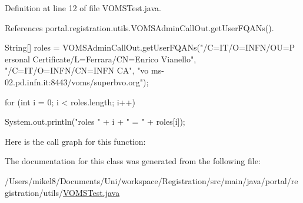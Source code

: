 Definition at line 12 of file VOMSTest.java.



References portal.registration.utils.VOMSAdminCallOut.getUserFQANs().


\begin{DoxyCode}
                                                                                 
                                                   {
                
                
                String[] roles = VOMSAdminCallOut.getUserFQANs("/C=IT/O=INFN/OU=P
      ersonal Certificate/L=Ferrara/CN=Enrico Vianello", "/C=IT/O=INFN/CN=INFN CA", "vo
      ms-02.pd.infn.it:8443/voms/superbvo.org");

                for (int i = 0; i < roles.length; i++) {

                        System.out.println("roles " + i + " = " + roles[i]);

                }
        }
\end{DoxyCode}


Here is the call graph for this function:




The documentation for this class was generated from the following file:\begin{DoxyCompactItemize}
\item 
/Users/mikel8/Documents/Uni/workspace/Registration/src/main/java/portal/registration/utils/\hyperlink{VOMSTest_8java}{VOMSTest.java}\end{DoxyCompactItemize}
